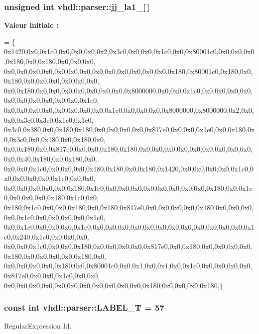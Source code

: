 \subsubsection[{jj\+\_\+la1\+\_\+5}]{\setlength{\rightskip}{0pt plus 5cm}unsigned int vhdl\+::parser\+::jj\+\_\+la1\+\_\mbox{[}$\,$\mbox{]}}\label{namespacevhdl_1_1parser_a625decea2d793f0d02d0ea61a7d4f12a}
{\bfseries Valeur initiale \+:}
\begin{DoxyCode}
= \{
0x1420,0x0,0x1c0,0x0,0x0,0x0,0x2,0x3c0,0x0,0x0,0x1c0,0x0,0x80001c0,0x0,0x0,0x0,0x180,0x0,0x180,0x0,0x0,0x0,
      0x0,0x0,0x0,0x0,0x0,0x0,0x0,0x0,0x0,0x0,0x0,0x0,0x0,0x180,0x80001c0,0x180,0x0,0x180,0x0,0x0,0x0,0x0,0x0,0x0,
      0x0,0x180,0x0,0x0,0x0,0x0,0x0,0x0,0x0,0x8000000,0x0,0x0,0x1c0,0x0,0x0,0x0,0x0,0x0,0x0,0x0,0x0,0x0,0x0,0x1c0,
      0x0,0x0,0x0,0x0,0x0,0x0,0x0,0x0,0x1c0,0x0,0x0,0x0,0x8000000,0x8000000,0x2,0x0,0x0,0x3c0,0x3c0,0x1c0,0x1c0,
      0x3c0,0x380,0x0,0x180,0x180,0x0,0x0,0x0,0x0,0x817e0,0x0,0x0,0x1e0,0x0,0x180,0x0,0x3c0,0x0,0x180,0x0,0x180,0x0,
      0x0,0x180,0x0,0x817e0,0x0,0x0,0x180,0x180,0x0,0x0,0x0,0x0,0x0,0x0,0x0,0x0,0x0,0x0,0x40,0x180,0x0,0x180,0x0,
      0x0,0x0,0x1c0,0x0,0x0,0x0,0x180,0x180,0x0,0x180,0x1420,0x0,0x0,0x0,0x0,0x1c0,0x0,0x0,0x0,0x0,0x1c0,0x0,0x0,
      0x0,0x0,0x0,0x0,0x0,0x180,0x1c0,0x0,0x0,0x0,0x0,0x0,0x0,0x0,0x0,0x180,0x0,0x1c0,0x0,0x0,0x0,0x180,0x1c0,0x0,
      0x180,0x1c0,0x0,0x0,0x180,0x0,0x180,0x817e0,0x0,0x0,0x0,0x0,0x180,0x0,0x0,0x0,0x0,0x1c0,0x0,0x0,0x0,0x0,0x1c0,
      0x0,0x1c0,0x0,0x0,0x0,0x1c0,0x0,0x0,0x0,0x0,0x0,0x0,0x0,0x0,0x0,0x0,0x0,0x0,0x1c0,0x240,0x1c0,0x0,0x0,0x0,
      0x0,0x0,0x1c0,0x0,0x0,0x180,0x0,0x0,0x0,0x0,0x817e0,0x0,0x180,0x0,0x0,0x0,0x0,0x180,0x0,0x0,0x0,0x0,0x180,0x0,
      0x0,0x0,0x0,0x0,0x180,0x0,0x80001c0,0x0,0x1,0x0,0x1,0x0,0x1c0,0x0,0x0,0x0,0x0,0x817e0,0x0,0x0,0x1c0,0x0,0x0,
      0x0,0x0,0x0,0x0,0x0,0x0,0x0,0x0,0x0,0x0,0x0,0x180,0x0,0x0,0x0,0x180,\}
\end{DoxyCode}
\hypertarget{namespacevhdl_1_1parser_a61cf9af7a1c8d6f472fb78d9bd5103e6}{}
\subsubsection[{L\+A\+B\+E\+L\+\_\+\+T}]{\setlength{\rightskip}{0pt plus 5cm}const int vhdl\+::parser\+::\+L\+A\+B\+E\+L\+\_\+\+T = 57}\label{namespacevhdl_1_1parser_a61cf9af7a1c8d6f472fb78d9bd5103e6}
Regular\+Expression Id. \hypertarget{namespacevhdl_1_1parser_a21d79c7e06df68dbd9b96c4869c77102}{}
